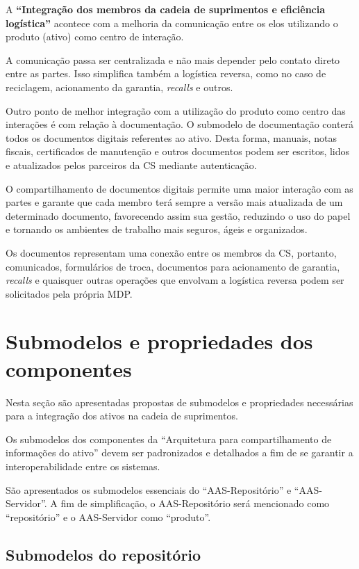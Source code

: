A \textbf{``Integração dos membros da cadeia de suprimentos e eficiência logística''} acontece com a melhoria da comunicação entre os elos utilizando o produto (ativo) como centro de interação.

A comunicação passa ser centralizada e não mais depender pelo contato direto entre as partes. Isso simplifica também a logística reversa, como no caso de reciclagem, acionamento da garantia, \textit{recalls} e outros.

Outro ponto de melhor integração com a utilização do produto como centro das interações é com relação à documentação. O submodelo de documentação conterá todos os documentos digitais referentes ao ativo. Desta forma, manuais, notas fiscais, certificados de manutenção e outros documentos podem ser escritos, lidos e atualizados pelos parceiros da CS mediante autenticação.

O compartilhamento de documentos digitais permite uma maior interação com as partes e garante que cada membro terá sempre a versão mais atualizada de um determinado documento, favorecendo assim sua gestão, reduzindo o uso do papel e tornando os ambientes de trabalho mais seguros, ágeis e organizados.

Os documentos representam uma conexão entre os membros da CS, portanto, comunicados, formulários de troca, documentos para acionamento de garantia, \textit{recalls} e quaisquer outras operações que envolvam a logística reversa podem ser solicitados pela própria MDP.

\section{Submodelos e propriedades dos componentes}

Nesta seção são apresentadas propostas de submodelos e propriedades necessárias para a integração dos ativos na cadeia de suprimentos.

Os submodelos dos componentes da ``Arquitetura para compartilhamento de informações do ativo'' devem ser padronizados e detalhados a fim de se garantir a interoperabilidade entre os sistemas.

São apresentados os submodelos essenciais do ``AAS-Repositório'' e ``AAS-Servidor''. A fim de simplificação, o AAS-Repositório será mencionado como ``repositório'' e o AAS-Servidor como ``produto''.

\subsection{Submodelos do repositório}


